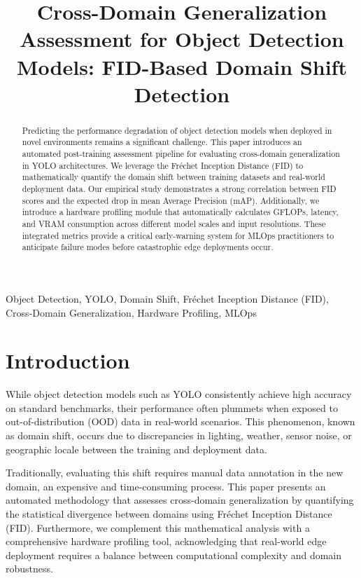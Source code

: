 \documentclass[conference]{IEEEtran}
\begin{document}
\title{Cross-Domain Generalization Assessment for Object Detection Models: FID-Based Domain Shift Detection}

\author{
}

\maketitle

\begin{abstract}
Predicting the performance degradation of object detection models when deployed in novel environments remains a significant challenge. This paper introduces an automated post-training assessment pipeline for evaluating cross-domain generalization in YOLO architectures. We leverage the Fréchet Inception Distance (FID) to mathematically quantify the domain shift between training datasets and real-world deployment data. Our empirical study demonstrates a strong correlation between FID scores and the expected drop in mean Average Precision (mAP). Additionally, we introduce a hardware profiling module that automatically calculates GFLOPs, latency, and VRAM consumption across different model scales and input resolutions. These integrated metrics provide a critical early-warning system for MLOps practitioners to anticipate failure modes before catastrophic edge deployments occur.
\end{abstract}

\begin{IEEEkeywords}
Object Detection, YOLO, Domain Shift, Fréchet Inception Distance (FID), Cross-Domain Generalization, Hardware Profiling, MLOps
\end{IEEEkeywords}

\section{Introduction}
While object detection models such as YOLO consistently achieve high accuracy on standard benchmarks, their performance often plummets when exposed to out-of-distribution (OOD) data in real-world scenarios. This phenomenon, known as domain shift, occurs due to discrepancies in lighting, weather, sensor noise, or geographic locale between the training and deployment data.

Traditionally, evaluating this shift requires manual data annotation in the new domain, an expensive and time-consuming process. This paper presents an automated methodology that assesses cross-domain generalization by quantifying the statistical divergence between domains using Fréchet Inception Distance (FID). Furthermore, we complement this mathematical analysis with a comprehensive hardware profiling tool, acknowledging that real-world edge deployment requires a balance between computational complexity and domain robustness.
\end{document}
